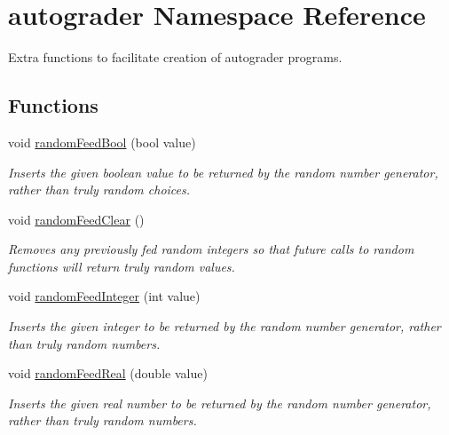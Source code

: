 \hypertarget{namespaceautograder}{}\section{autograder Namespace Reference}
\label{namespaceautograder}


Extra functions to facilitate creation of autograder programs.  


\subsection*{Functions}
\begin{DoxyCompactItemize}
\item 
void \mbox{\hyperlink{namespaceautograder_a9dc13baafecf9d7782bb8fe7e23201ca}{random\+Feed\+Bool}} (bool value)
\begin{DoxyCompactList}\small\item\em Inserts the given boolean value to be returned by the random number generator, rather than truly random choices. \end{DoxyCompactList}\item 
void \mbox{\hyperlink{namespaceautograder_a448f8778ed42e2d2939d1732b7bd5748}{random\+Feed\+Clear}} ()
\begin{DoxyCompactList}\small\item\em Removes any previously \textquotesingle{}fed\textquotesingle{} random integers so that future calls to random functions will return truly random values. \end{DoxyCompactList}\item 
void \mbox{\hyperlink{namespaceautograder_a4373a6a00739bdae4c357b55efaccabd}{random\+Feed\+Integer}} (int value)
\begin{DoxyCompactList}\small\item\em Inserts the given integer to be returned by the random number generator, rather than truly random numbers. \end{DoxyCompactList}\item 
void \mbox{\hyperlink{namespaceautograder_aa82b490cbbce99abe6b30f854ff8112d}{random\+Feed\+Real}} (double value)
\begin{DoxyCompactList}\small\item\em Inserts the given real number to be returned by the random number generator, rather than truly random numbers. \end{DoxyCompactList}\end{DoxyCompactItemize}


